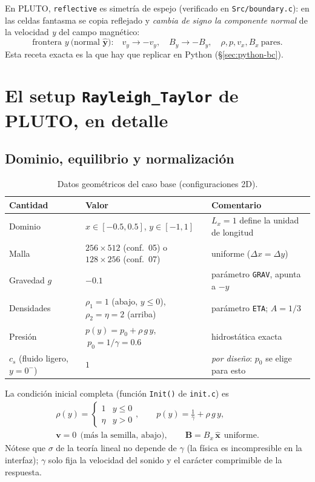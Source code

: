 \documentclass[11pt,a4paper]{article}
\newcommand{\B}{\mathbf{B}}
\newcommand{\vct}{\mathbf{v}}
\newcommand{\code}[1]{\texttt{#1}}
\begin{document}
En PLUTO, \code{reflective} es simetría de espejo (verificado en \code{Src/boundary.c}):
en las celdas fantasma se copia reflejado y \emph{cambia de signo la componente normal}
de la velocidad \emph{y} del campo magnético:
\begin{equation}
\text{frontera }y\ \text{(normal }\hat{\mathbf{y}}\text{):}\quad
v_y\to -v_y,\quad B_y\to -B_y,\quad
\rho,p,v_x,B_x\ \text{pares.}
\label{eq:bc}
\end{equation}
Esta receta exacta es la que hay que replicar en Python (\S\ref{sec:python-bc}).

\section{El setup \texttt{Rayleigh\_Taylor} de PLUTO, en detalle}
\label{sec:setup}

\subsection{Dominio, equilibrio y normalización}

\begin{table}[htbp]
\centering\small
\caption{Datos geométricos del caso base (configuraciones 2D).}
\begin{tabular}{@{}llp{4.3cm}@{}}
\toprule
Cantidad & Valor & Comentario \\
\midrule
Dominio & $x\in[-0.5,0.5]$, $y\in[-1,1]$ & $L_x=1$ define la unidad de longitud \\
Malla & $256\times512$ (conf.\ 05) o $128\times256$ (conf.\ 07) & uniforme ($\Delta x=\Delta y$) \\
Gravedad $g$ & $-0.1$ & parámetro \code{GRAV}, apunta a $-y$ \\
Densidades & $\rho_1=1$ (abajo, $y\le 0$), $\rho_2=\eta=2$ (arriba) & parámetro \code{ETA}; $A=1/3$ \\
Presión & $p(y)=p_0+\rho\,g\,y$, $\ p_0=1/\gamma=0.6$ & hidrostática exacta \\
$c_s$ (fluido ligero, $y=0^-$) & $1$ & \emph{por diseño}: $p_0$ se elige para esto \\
\bottomrule
\end{tabular}
\end{table}

La condición inicial completa (función \code{Init()} de \code{init.c}) es
\begin{equation}
\begin{gathered}
\rho(y)=\begin{cases}1 & y\le 0\\ \eta & y>0\end{cases},
\qquad
p(y) = \frac{1}{\gamma}+\rho\,g\,y,\\[2pt]
\vct=0\ \ \text{(más la semilla, abajo)},
\qquad
\B = B_x\,\hat{\mathbf{x}}\ \ \text{uniforme}.
\end{gathered}
\label{eq:ci}
\end{equation}
Nótese que $\sigma$ de la teoría lineal no depende de $\gamma$ (la física es incompresible
en la interfaz); $\gamma$ solo fija la velocidad del sonido y el carácter comprimible de la
respuesta.
\end{document}
